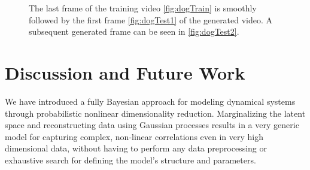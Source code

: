 \documentclass{article} %
\begin{document}
\begin{figure}[ht]
\begin{center}
\end{center}
\caption{ \small{
The last frame of the training video \ref{fig:dogTrain} is smoothly followed by the first frame \ref{fig:dogTest1} of the generated video. A subsequent generated frame can be seen in \ref{fig:dogTest2}}.}
\label{fig:dog}
\end{figure}


\section{Discussion and Future Work}

We have introduced a fully Bayesian approach for modeling dynamical
systems through probabilistic nonlinear dimensionality
reduction. Marginalizing the latent space and reconstructing data
using Gaussian processes results in a very generic model for capturing
complex, non-linear correlations even in very high dimensional data,
without having to perform any data preprocessing or exhaustive search
for defining the model's structure and parameters.


\end{document}
